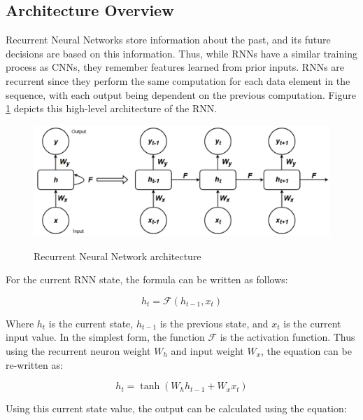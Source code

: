 \subsection{Architecture Overview}
\label{subsec:ch2-time-series-overview}

Recurrent Neural Networks store information about the past, and its future decisions are based on this information. Thus, while RNNs have a similar training process as CNNs, they remember features learned from prior inputs. RNNs are recurrent since they perform the same computation for each data element in the sequence, with each output being dependent on the previous computation. Figure \ref{fig:rnn-architecture} depicts this high-level architecture of the RNN.\par

\begin{figure}[htb]
    \centering
    \caption{Recurrent Neural Network architecture}
    \includegraphics[width=1.0\linewidth]{Figures/RNN-Overview.pdf}
    \label{fig:rnn-architecture}
\end{figure}

For the current RNN state, the formula can be written as follows:

\begin{equation}
    h_{t} = \mathcal{F}(h_{t-1}, x_{t})
\end{equation}

Where $h_{t}$ is the current state, $h_{t-1}$ is the previous state, and $x_{t}$ is the current input value. In the simplest form, the function $\mathcal{F}$ is the activation function. Thus using the recurrent neuron weight $W_{h}$ and input weight $W_{x}$, the equation can be re-written as:

\begin{equation}
    h_{t} = \tanh(W_{h}h_{t-1} + W_{x}x_{t})
\end{equation}

Using this current state value, the output can be calculated using the equation:

